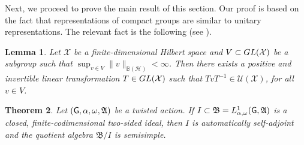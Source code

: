 \documentclass[11pt]{article}
\newcommand{\A}{\mathfrak{A}}
\newcommand{\B}{\mathfrak{B}}
\def\X{\mathcal{X}}
\def\BofH{\mathbb B(\mathcal H)}
\def\G{{\sf G}}
\providecommand{\norm}[1]{\lVert#1\rVert}
\newtheorem{thm}{Theorem}[section]
\newtheorem{lem}[thm]{Lemma}
\theoremstyle{definition}
\theoremstyle{remark}
\numberwithin{equation}{section}
\numberwithin{equation}{section}
\begin{document}
Next, we proceed to prove the main result of this section. Our proof is based on the fact that representations of compact groups are similar to unitary representations. The relevant fact is the following (see \cite[Theorem 0.1]{Pi05}).

\begin{lem}\label{dix}
Let $\X$ be a finite-dimensional Hilbert space and $V\subset {\rm GL}(\X)$ be a subgroup such that $\sup_{v\in V}\norm{v}_{\BofH}<\infty$. Then there exists a positive and invertible linear transformation $T\in {\rm GL}(\X)$ such that $TvT^{-1}\in \mathcal U(\X)$, for all $v\in V$.
\end{lem}

\begin{thm}\label{semisimplicity}
Let $(\G,\alpha,\omega,\A)$ be a twisted action. If $I\subset \B=L^1_{\alpha,\omega}(\G,\A)$ is a closed, finite-codimensional two-sided ideal, then $I$ is automatically self-adjoint and the quotient algebra $\B/I$ is semisimple.
\end{thm}
\end{document}
